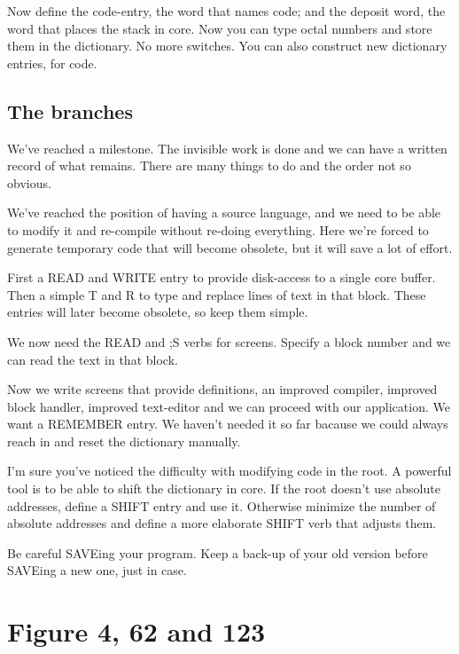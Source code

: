 \documentclass[b5paper, oneside]{book}
\begin{document}
Now define the code-entry, the word that names code; and the deposit word, the word that places the stack in core. Now you can type octal numbers and store them in the dictionary. No more switches. You can also construct new dictionary entries, for code.

\section{The branches}
We've reached a milestone. The invisible work is done and we can have a written record of what remains. There are many things to do and the order not so obvious.

We've reached the position of having a source language, and we need to be able to modify it and re-compile without re-doing everything. Here we're forced to generate temporary code that will become obsolete, but it will save a lot of effort.

First a READ and WRITE entry to provide disk-access to a single core buffer. Then a simple T and R to type and replace lines of text in that block. These entries will later become obsolete, so keep them simple.

We now need the READ and ;S verbs for screens. Specify a block number and we can read the text in that block.

Now we write screens that provide definitions, an improved compiler, improved block handler, improved text-editor and we can proceed with our application. We want a REMEMBER entry. We haven't needed it so far bacause we could always reach in and reset the dictionary manually.

I'm sure you've noticed the difficulty with modifying code in the root. A powerful tool is to be able to shift the dictionary in core. If the root doesn't use absolute addresses, define a SHIFT entry and use it. Otherwise minimize the number of absolute addresses and define a more elaborate SHIFT verb that adjusts them.

Be careful SAVEing your program. Keep a back-up of your old version before SAVEing a new one, just in case.


\appendix


\chapter{Figure 4, 62 and 123}
\end{document}

